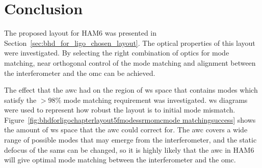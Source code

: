 \section{Conclusion}
\label{sec:BHD_for_ligo_conclusion}
The proposed layout for HAM6 was presented in Section~\ref{sec:bhd_for_ligo_chosen_layout}. The optical properties of this layout were investigated. By selecting the right combination of optics for mode matching, near orthogonal control of the mode matching and alignment between the interferometer and the \gls{omc} can be achieved.
\par
The effect that the \gls{awc} had on the region of \gls{ws} space that contains modes which satisfy the $>98\%$ mode matching requirement was investigated. \gls{ws} diagrams were used to represent how robust the layout is to initial mode mismatch. Figure~\ref{fig:bhdforligochapterlayout5fmodessrmomcmode matchingsuccess} shows the amount of \gls{ws} space that the \gls{awc} could correct for. The \gls{awc} covers a wide range of possible modes that may emerge from the interferometer, and the static defocus of the \gls{sams} can be changed, so it is highly likely that the \gls{awc} in HAM6 will give optimal mode matching between the interferometer and the \gls{omc}. 